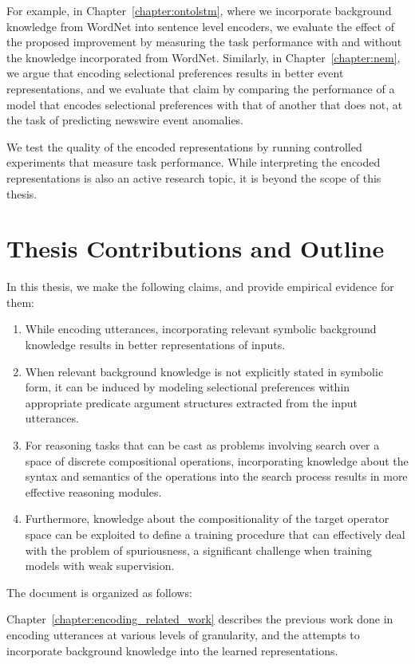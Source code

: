 For example, in Chapter~\ref{chapter:ontolstm}, where we incorporate background knowledge from
WordNet into sentence level encoders, we evaluate the effect of the proposed improvement by
measuring the task performance with and without the knowledge incorporated from WordNet. Similarly,
in Chapter~\ref{chapter:nem}, we argue that encoding selectional preferences results in better event
representations, and we evaluate that claim by comparing the performance of a model that encodes
selectional preferences with that of another that does not, at the task of predicting
newswire event anomalies.

We test the quality of the encoded representations by running controlled experiments that measure
task performance. While interpreting the encoded representations is also an active research
topic, it is beyond the scope of this thesis.

\section{Thesis Contributions and Outline}
In this thesis, we make the following claims, and provide empirical evidence for them:
\begin{enumerate}
	\item While encoding utterances, incorporating relevant symbolic background knowledge results
		in better representations of inputs.
	\item When relevant background knowledge is not explicitly stated in symbolic form,
		it can be induced by modeling selectional preferences within appropriate predicate argument
		structures extracted from the input utterances.
	\item For reasoning tasks that can be cast as problems involving search over a space of
		discrete compositional operations, incorporating knowledge about the syntax and semantics
		of the operations into the search process results in more effective reasoning modules.
	\item Furthermore, knowledge about the compositionality of the target operator space
		can be exploited to define a training procedure that can effectively deal with the
		problem of spuriousness, a significant challenge when training models with weak
		supervision.
\end{enumerate}

The document is organized as follows:

Chapter~\ref{chapter:encoding_related_work} describes the previous work done in encoding utterances
at various levels of granularity, and the attempts to incorporate background knowledge into
the learned representations.


